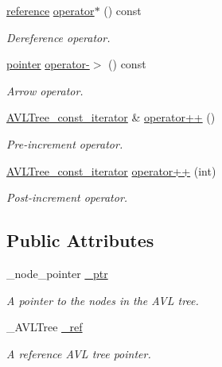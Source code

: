 \begin{DoxyCompactItemize}
\hyperlink{class_a_v_l_tree__const__iterator_a60f81dd86cc602fcc95a298df957990b}{reference} \hyperlink{class_a_v_l_tree__const__iterator_afcbc171c8f59cfda44b0063f99177e56}{operator$\ast$} () const 
\begin{DoxyCompactList}\small\item\em Dereference operator. \end{DoxyCompactList}\item 
\hyperlink{class_a_v_l_tree__const__iterator_a0fbfdccc80380ae68a44281dcc18e770}{pointer} \hyperlink{class_a_v_l_tree__const__iterator_afcff074e299c45ae42196b5e4b4be8d0}{operator-\/$>$} () const 
\begin{DoxyCompactList}\small\item\em Arrow operator. \end{DoxyCompactList}\item 
\hyperlink{class_a_v_l_tree__const__iterator}{A\+V\+L\+Tree\+\_\+const\+\_\+iterator} \& \hyperlink{class_a_v_l_tree__const__iterator_ad881a06d60c2f8481d1b3f08ba32e3fa}{operator++} ()
\begin{DoxyCompactList}\small\item\em Pre-\/increment operator. \end{DoxyCompactList}\item 
\hyperlink{class_a_v_l_tree__const__iterator}{A\+V\+L\+Tree\+\_\+const\+\_\+iterator} \hyperlink{class_a_v_l_tree__const__iterator_a4d43deacd7fe153f00031da0f5b9597e}{operator++} (int)
\begin{DoxyCompactList}\small\item\em Post-\/increment operator. \end{DoxyCompactList}\end{DoxyCompactItemize}
\subsection*{Public Attributes}
\begin{DoxyCompactItemize}
\item 
\+\_\+node\+\_\+pointer \hyperlink{class_a_v_l_tree__const__iterator_ad8477a42408fd130992d2cfcb42dcb5d}{\+\_\+ptr}
\begin{DoxyCompactList}\small\item\em A pointer to the nodes in the A\+V\+L tree. \end{DoxyCompactList}\item 
\+\_\+\+A\+V\+L\+Tree \hyperlink{class_a_v_l_tree__const__iterator_ad7a12b75802e659f5991bcf31cbf8acb}{\+\_\+ref}
\begin{DoxyCompactList}\small\item\em A reference A\+V\+L tree pointer. \end{DoxyCompactList}\end{DoxyCompactItemize}
